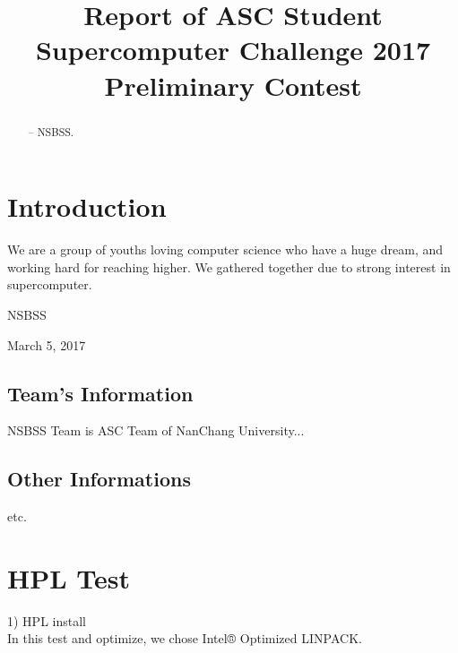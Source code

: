 \documentclass[conference,compsoc]{report}
\begin{document}
\title{Report of ASC Student Supercomputer Challenge 2017 Preliminary Contest}

\author{

\and


}

\maketitle

\begin{abstract}
-- NSBSS.
\end{abstract}
\IEEEpeerreviewmaketitle

\section{Introduction}
We are a group of youths loving computer science who have a
huge dream, and working hard for reaching higher. We gathered
together due to strong interest in supercomputer.

\hfill NSBSS
 
\hfill March 5, 2017

\subsection{Team's Information}
NSBSS Team is ASC Team of NanChang University...


\subsection{Other Informations}
etc.


\section{HPL Test}
1) HPL install \\

In this test and optimize, we chose Intel® Optimized LINPACK. \\
\end{document}
